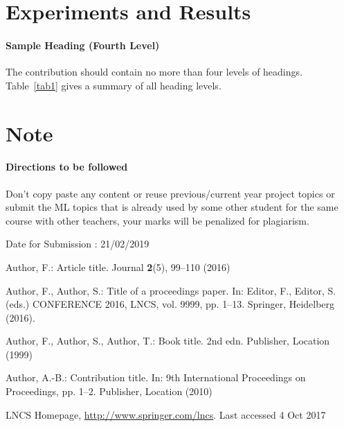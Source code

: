 \documentclass[runningheads]{llncs}
\begin{document}
\section{Experiments and Results\textsl{}}

\paragraph{Sample Heading (Fourth Level)}
The contribution should contain no more than four levels of
headings. Table~\ref{tab1} gives a summary of all heading levels.


\section{Note}

\paragraph{Directions to be followed}
Don’t copy paste any content or reuse previous/current year project topics or submit the ML topics that is already used by some other student for the same course with other teachers, your marks will be penalized for plagiarism.

Date for Submission : 21/02/2019



%
%
%
% 
% 
%
\begin{thebibliography}{8}
Author, F.: Article title. Journal \textbf{2}(5), 99--110 (2016)

Author, F., Author, S.: Title of a proceedings paper. In: Editor,
F., Editor, S. (eds.) CONFERENCE 2016, LNCS, vol. 9999, pp. 1--13.
Springer, Heidelberg (2016). 

Author, F., Author, S., Author, T.: Book title. 2nd edn. Publisher,
Location (1999)

Author, A.-B.: Contribution title. In: 9th International Proceedings
on Proceedings, pp. 1--2. Publisher, Location (2010)

LNCS Homepage, \url{http://www.springer.com/lncs}. Last accessed 4
Oct 2017
\end{thebibliography}
\end{document}
